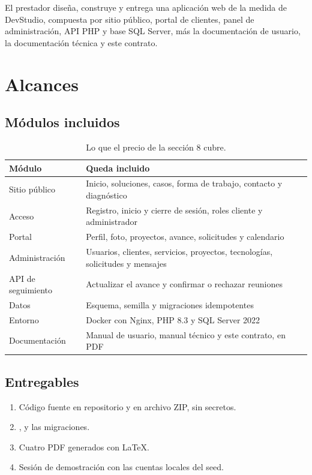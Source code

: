 El prestador diseña, construye y entrega una aplicación web de la medida de
DevStudio, compuesta por sitio público, portal de clientes, panel de
administración, API PHP y base SQL Server, más la documentación de usuario,
la documentación técnica y este contrato.

\section{Alcances}

\subsection{Módulos incluidos}

\begin{table}[H]
  \centering
  \caption{Lo que el precio de la sección 8 cubre.}
  \label{tab:alcance}
  \small
  \begin{tabularx}{\textwidth}{@{}l Y@{}}
    \toprule
    Módulo & Queda incluido \\
    \midrule
    Sitio público & Inicio, soluciones, casos, forma de trabajo, contacto y diagnóstico \\
    Acceso & Registro, inicio y cierre de sesión, roles cliente y administrador \\
    Portal & Perfil, foto, proyectos, avance, solicitudes y calendario \\
    Administración & Usuarios, clientes, servicios, proyectos, tecnologías, solicitudes y mensajes \\
    API de seguimiento & Actualizar el avance y confirmar o rechazar reuniones \\
    Datos & Esquema, semilla y migraciones idempotentes \\
    Entorno & Docker con Nginx, PHP 8.3 y SQL Server 2022 \\
    Documentación & Manual de usuario, manual técnico y este contrato, en PDF \\
    \bottomrule
  \end{tabularx}
\end{table}

\subsection{Entregables}

\begin{enumerate}
  \item Código fuente en repositorio y en archivo ZIP, sin secretos.
  \item {},  y las migraciones.
  \item Cuatro PDF generados con LaTeX.
  \item Sesión de demostración con las cuentas locales del seed.
\end{enumerate}

